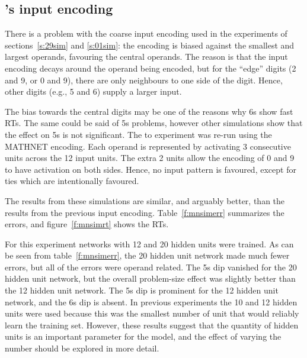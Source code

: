 \subsection{\protect\citeauthor{mcclmath}'s input encoding}

There is a problem with the coarse
input encoding used in the experiments of sections~\ref{s:29sim}
and \ref{s:01sim}: the
encoding is biased against the smallest and largest
operands, favouring the central operands.  The reason is that
the input encoding decays around the operand being encoded, but for the
``edge'' digits (2 and 9, or 0 and 9), there are only neighbours to one
side of the digit.  Hence, other digits (e.g., 5 and 6) supply a larger
input.

The bias towards the central digits may
be one of the reasons why 6s show fast RTs.
The same could be said of 5s
problems, however other simulations show that the effect on 5s is not
significant.  The  to  experiment was re-run using the MATHNET
encoding. Each operand is represented by activating 3 consecutive units
across the 12 input units. The
extra 2 units allow the encoding of 0 and 9
to have activation on both sides.  Hence, no input pattern is favoured,
except for ties which are intentionally favoured.

The results from these simulations are similar, and arguably better, than
the results from the previous input encoding.  Table~\ref{f:mnsimerr}
summarizes the errors, and figure~\ref{f:mnsimrt} shows the RTs.

For this experiment networks with 12 and 20 hidden units were trained.  As
can be seen from table~\ref{f:mnsimerr}, the 20 hidden unit network made
much fewer errors, but all of the errors were operand related.  The 5s dip
vanished for the 20 hidden unit network, but the overall problem-size
effect was
slightly better than the 12 hidden unit network. The 5s dip is prominent
for the 12 hidden unit network, and the 6s dip is absent.  In previous
experiments the 10 and 12 hidden units were used because this was the
smallest number of unit that would reliably learn the training set.
However, these results suggest that the quantity of hidden units is an
important parameter for the model, and the effect of varying the number
should be explored in more detail.

